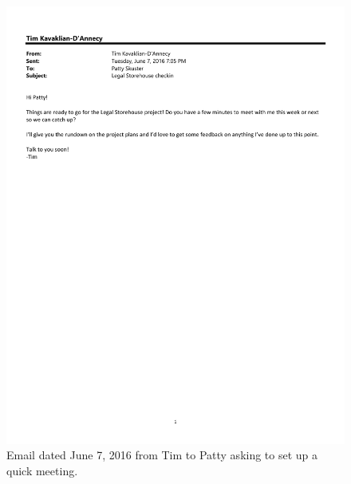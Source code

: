 \begin{figure}
   \centering
       \noindent\includegraphics[page=1,angle=-90,origin=c,width=.75\textwidth,height=.75\textheight]{documents/2016-06-07-Email-Tim-Patty.pdf}
 \caption{Email dated June 7, 2016 from Tim to Patty asking to set up a quick meeting.}
 \label{fig:2016-06-07-Email-Tim-Patty}
\end{figure}

